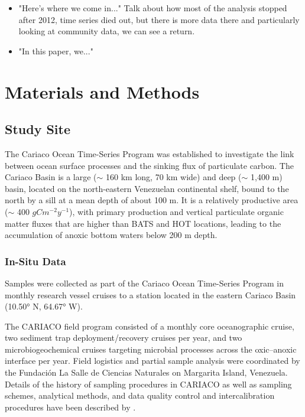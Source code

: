 \documentclass[draft]{agujournal2019}
\begin{document}
\begin{itemize}
        
        \item "Here's where we come in..." Talk about how most of the analysis stopped after 2012, time series died out, but there is more data there and particularly looking at community data, we can see a return.
    
        \item "In this paper, we..." 
        
    \end{itemize}


\section{Materials and Methods}
%
\subsection{Study Site}
    The Cariaco Ocean Time-Series Program was established to investigate the link between ocean surface processes and the sinking flux of particulate carbon. The Cariaco Basin is a large ($\sim$ 160 km long, 70 km wide) and deep ($\sim$ 1,400 m) basin, located on the north-eastern Venezuelan continental shelf, bound to the north by a sill at a mean depth of about 100 m. It is a relatively productive area ($\sim$ 400 $g C m^{-2} y^{-1}$), with primary production and vertical particulate organic matter fluxes that are higher than BATS and HOT locations, leading to the accumulation of anoxic bottom waters below 200 m depth.

    \subsubsection{In-Situ Data}
    Samples were collected as part of the Cariaco Ocean Time-Series Program in monthly research vessel cruises to a station located in the eastern Cariaco Basin (10.50° N, 64.67° W). %

    The CARIACO field program consisted of a monthly core oceanographic cruise, two sediment trap deployment/recovery cruises per year, and two microbiogeochemical cruises targeting microbial processes across the oxic–anoxic interface per year. Field logistics and partial sample analysis were coordinated by the Fundación La Salle de Ciencias Naturales on Margarita Island, Venezuela. Details of the history of sampling procedures in CARIACO as well as sampling schemes, analytical methods, and data quality control and intercalibration procedures have been described by .
    
\end{document}

